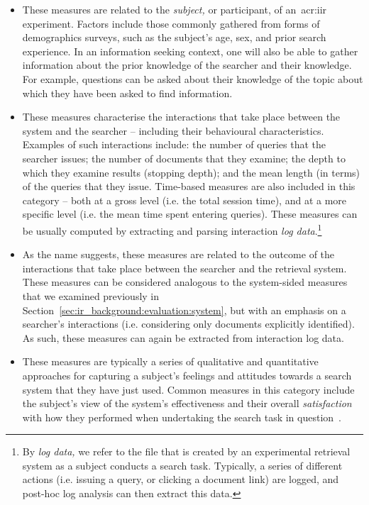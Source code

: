 \begin{itemize}
    \item{ These measures are related to the \emph{subject,} or participant, of an~\gls{acr:iir} experiment. Factors include those commonly gathered from forms of demographics surveys, such as the subject's age, sex, and prior search experience. In an information seeking context, one will also be able to gather information about the prior knowledge of the searcher and their knowledge. For example, questions can be asked about their knowledge of the topic about which they have been asked to find information.}
    
    \item{ These measures characterise the interactions that take place between the system and the searcher -- including their behavioural characteristics. Examples of such interactions include: the number of queries that the searcher issues; the number of documents that they examine; the depth to which they examine results (stopping depth); and the mean length (in terms) of the queries that they issue. Time-based measures are also included in this category -- both at a gross level (i.e. the total session time), and at a more specific level (i.e. the mean time spent entering queries). These measures can be usually computed by extracting and parsing interaction \emph{log data}.\footnote{By \emph{log data,} we refer to the file that is created by an experimental retrieval system as a subject conducts a search task. Typically, a series of different actions (i.e. issuing a query, or clicking a document link) are logged, and post-hoc log analysis can then extract this data.}}
    
    \item{ As the name suggests, these measures are related to the outcome of the interactions that take place between the searcher and the retrieval system. These measures can be considered analogous to the system-sided measures that we examined previously in Section~\ref{sec:ir_background:evaluation:system}, but with an emphasis on a searcher's interactions (i.e. considering only documents explicitly identified). As such, these measures can again be extracted from interaction log data.}
    
    \item{ These measures are typically a series of qualitative and quantitative approaches for capturing a subject's feelings and attitudes towards a search system that they have just used. Common measures in this category include the subject's view of the system's effectiveness and their overall \emph{satisfaction} with how they performed when undertaking the search task in question~\citep{hornbaek2006usability}.}
\end{itemize}

